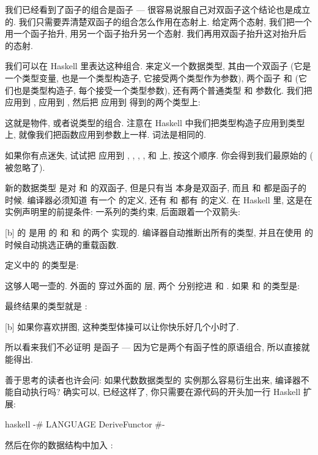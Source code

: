 我们已经看到了函子的组合是函子 --- 很容易说服自己对双函子这个结论也是成立的. 我们只需要弄清楚双函子的组合怎么作用在态射上.
给定两个态射, 我们把一个用一个函子抬升, 用另一个函子抬升另一个态射. 我们再用双函子抬升这对抬升后的态射.

我们可以在 Haskell 里表达这种组合. 来定义一个数据类型, 其由一个双函子  (它是一个类型变量, 也是一个类型构造子,
它接受两个类型作为参数), 两个函子  和  (它们也是类型构造子, 每个接受一个类型参数), 还有两个普通类型
 和  参数化. 我们把  应用到 ,  应用到 , 然后把  应用到
得到的两个类型上:

这就是物件, 或者说类型的组合. 注意在 Haskell 中我们把类型构造子应用到类型上, 就像我们把函数应用到参数上一样.
词法是相同的.

如果你有点迷失, 试试把  应用到 , , , , 和
 上, 按这个顺序. 你会得到我们最原始的  ( 被忽略了).

新的数据类型  是对  和  的双函子, 但是只有当  本身是双函子, 而且 
和  都是函子的时候. 编译器必须知道  有一个  的定义, 还有  和  都有
 的定义. 在 Haskell 里, 这是在实例声明里的前提条件: 一系列的类约束, 后面跟着一个双箭头:

[b]
 的  是用  的  和  和  的两个 
实现的. 编译器自动推断出所有的类型, 并且在使用  的时候自动挑选正确的重载函数.

 定义中的  的类型是:

这够人喝一壶的. 外面的  穿过外面的  层, 两个  分别挖进  和 .
如果  和  的类型是:

最终结果的类型就是 :

[b]
如果你喜欢拼图, 这种类型体操可以让你快乐好几个小时了.

所以看来我们不必证明  是函子 --- 因为它是两个有函子性的原语组合, 所以直接就能得出.

善于思考的读者也许会问: 如果代数数据类型的  实例那么容易衍生出来, 编译器不能自动执行吗?
确实可以, 已经这样了, 你只需要在源代码的开头加一行 Haskell 扩展:

\begin{snip}{haskell}
{-# LANGUAGE DeriveFunctor #-}
\end{snip}
然后在你的数据结构中加入 :

